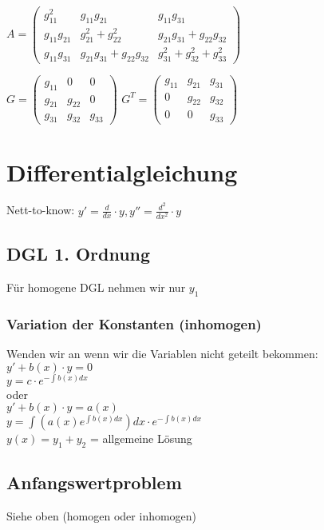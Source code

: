 \documentclass[a4paper, 8pt, landscape]{extarticle}
\let\oldint\int
\renewcommand{\int}{\ensuremath{\textstyle\oldint}}
\begin{document}
\begin{multicols*}{5}
			\begin{tiny}
				$A=\begin{pmatrix}
					g_{11}^{2} & g_{11}g_{21} & g_{11}g_{31}\\
					g_{11}g_{21} & g_{21}^{2}+g_{22}^{2} & g_{21}g_{31}+g_{22}g_{32}\\
					g_{11}g_{31} & g_{21}g_{31}+g_{22}g_{32} & g_{31}^{2}+g_{32}^{2}+g_{33}^{2}
				\end{pmatrix}$
				\begin{multicols}{2}
					$G=\begin{pmatrix}
						g_{11} & 0 & 0\\
						g_{21} & g_{22} & 0\\
						g_{31} & g_{32} & g_{33}
					\end{pmatrix}$
					$G^{T}=\begin{pmatrix}
						g_{11} & g_{21} & g_{31}\\
						0 & g_{22} & g_{32}\\
						0 & 0 & g_{33}
					\end{pmatrix}$
				\end{multicols}
			\end{tiny}
	\section{Differentialgleichung}
		Nett-to-know: $y'=\frac{d}{dx}\cdot y, y''= \frac{d^2}{dx^2}\cdot y$
		\subsection{DGL 1. Ordnung}
					Für homogene DGL nehmen wir nur $y_1$
			\subsubsection{Variation der Konstanten (inhomogen)}
				Wenden wir an wenn wir die Variablen nicht geteilt bekommen:\\
				$y'+b(x)\cdot y=0$\\
				$y = c\cdot e^{-\int b(x)dx}$\\
				oder\\
				$y'+b(x)\cdot y=a(x)$\\
				$y = \int(a(x)e^{\int b(x)dx})dx\cdot e^{-\int b(x)dx}$\\

				$y(x)=y_1+y_2$ = allgemeine Lösung
			\subsection{Anfangswertproblem}
				Siehe oben (homogen oder inhomogen)

\end{multicols*}
\end{document}
